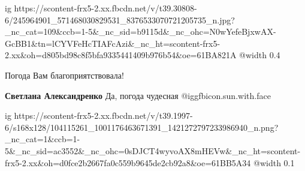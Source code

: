  
 
 
 
 

\ifcmt
  ig https://scontent-frx5-2.xx.fbcdn.net/v/t39.30808-6/245964901_571468030829531_8376533070721205735_n.jpg?_nc_cat=109&ccb=1-5&_nc_sid=b9115d&_nc_ohc=N0wYefeBjxwAX-GcBB1&tn=lCYVFeHcTIAFcAzi&_nc_ht=scontent-frx5-2.xx&oh=d805bd98c8f5bfa9335441409b976b54&oe=61BA821A
  @width 0.4
\fi

Погода Вам благоприятствовала!

\textbf{Светлана Александренко} Да, погода чудесная @igg{fbicon.sun.with.face} 


\ifcmt
  ig https://scontent-frx5-2.xx.fbcdn.net/v/t39.1997-6/s168x128/104115261_1001176463671391_1421272797233986940_n.png?_nc_cat=1&ccb=1-5&_nc_sid=ac3552&_nc_ohc=0sDJCT4wyvoAX8mHEVw&_nc_ht=scontent-frx5-2.xx&oh=d0fce2b2667fa0c559b9645de2cb92a8&oe=61BB5A34
  @width 0.1
\fi
